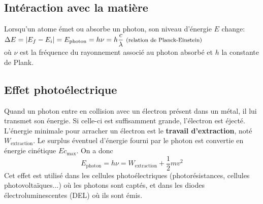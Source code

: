 \documentclass[a5paper,10pt]{article}
\begin{document}
\subsection{Intéraction avec la matière}
Lorsqu'un atome émet ou absorbe un photon, son niveau d'énergie $E$ change:\\[1em]
\vspace{1em}
\phantom{easter egg}$\displaystyle \Delta E=|E_f-E_i|=E_{\text{photon}} = h\nu = h\frac{c}{\lambda} \hfill\text{ \footnotesize(relation de Planck-Einstein)}$\\
où $\nu$ est la fréquence du rayonnement associé au photon absorbé et $h$ la constante de Plank.

\vspace{4pt}
\subsection{Effet photoélectrique}
Quand un photon entre en collision avec un électron présent dans un métal, il lui transmet son énergie. Si celle-ci est suffisamment grande, l'électron est éjecté. L'énergie minimale pour arracher un électron est le \textbf{travail d'extraction}, noté $W_{\text{extraction}}$. Le surplus éventuel d'énergie fourni par le photon est convertie en énergie cinétique $Ec_{\text{max}}$. On a donc
\[
  E_{\text{photon}}=h\nu=W_{\text{extraction}}+\frac{1}{2}mv^2
\]
Cet effet est utilisé dans les cellules photoélectriques (photorésistances, cellules photovoltaïques...) où les photons sont captés, et dans les diodes électroluminescentes (DEL) où ils sont émis.

  
  
\end{document}
